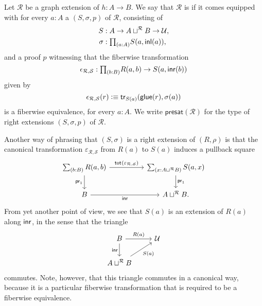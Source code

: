 \begin{defn}
Let $\mathcal{R}$ be a graph extension of $h:A\to B$. We say that $\mathcal{R}$ is  if it comes equipped with for every $a:A$ a  $(S,\sigma,p)$ of $\mathcal{R}$, consisting of
\begin{align*}
S & : A \to A\sqcup^{\mathcal{R}}B\to\UU, \\
\sigma & : \prd{a:A} S(a,\inl(a)),
\end{align*}
and a proof $p$ witnessing that the fiberwise transformation
\begin{equation*}
\epsilon_{\mathcal{R},\mathcal{S}}:\prd{b:B} R(a,b)\to S(a,\inr(b))
\end{equation*}
given by 
\begin{equation*}
\epsilon_{\mathcal{R},\mathcal{S}}(r)\vcentcolon\equiv \mathsf{tr}_{S(a)}(\mathsf{glue}(r),\sigma(a))
\end{equation*}
is a fiberwise equivalence, for every $a:A$. We write $\mathsf{presat}(\mathcal{R})$ for the type of right extensions $(S,\sigma,p)$ of $\mathcal{R}$.
\end{defn}

\begin{rmk}
Another way of phrasing that $(S,\sigma)$ is a right extension of $(R,\rho)$ is that the canonical transformation $\varepsilon_{\mathcal{R},\mathcal{S}}$ from $R(a)$ to $S(a)$ induces a pullback square
\begin{equation*}
\begin{tikzcd}[column sep=huge]
\sm{b:B}R(a,b) \arrow[d,swap,"\proj 1"] \arrow[r,"\total{\varepsilon_{\mathcal{R},\mathcal{S}}}"] & \sm{x:A\sqcup^{\mathcal{R}} B}S(a,x) \arrow[d,"\proj 1"] \\
B \arrow[r,swap,"\inr"] & A\sqcup^{\mathcal{R}} B.
\end{tikzcd}
\end{equation*}
From yet another point of view, we see that $S(a)$ is an extension of $R(a)$ along ${\mathsf{inr}}$, in the sense that the triangle
\begin{equation*}
\begin{tikzcd}
B \arrow[d,swap,"\inr"] \arrow[r,"R(a)"] & \UU \\
A\sqcup^{\mathcal{R}}B \arrow[ur,swap,"S(a)"]
\end{tikzcd}
\end{equation*}
commutes. Note, however, that this triangle commutes in a canonical way, because it is a particular fiberwise transformation that is required to be a fiberwise equivalence.
\end{rmk}

